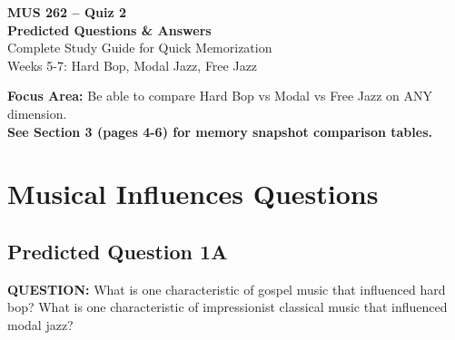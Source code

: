 \documentclass[11pt]{article}
\begin{document}
\begin{center}
{\Huge \textbf{MUS 262 – Quiz 2}}\\[5pt]
{\LARGE \textbf{Predicted Questions \& Answers}}\\[10pt]
{\Large Complete Study Guide for Quick Memorization}\\[5pt]
{\large Weeks 5-7: Hard Bop, Modal Jazz, Free Jazz}
\end{center}

\vspace{10pt}

\begin{tcolorbox}[colback=yellow!10!white, colframe=orange!75!black, title=\textbf{CRITICAL: ~30\% of Quiz 2 = THREE-WAY COMPARISONS}]
\textbf{Focus Area:} Be able to compare Hard Bop vs Modal vs Free Jazz on ANY dimension.\\
\textbf{See Section 3 (pages 4-6) for memory snapshot comparison tables.}
\end{tcolorbox}

\section{Musical Influences Questions}

\subsection*{Predicted Question 1A}

\begin{mdframed}[backgroundcolor=questioncolor!10, linewidth=2pt]
\textbf{\textcolor{questioncolor}{QUESTION:}} What is one characteristic of gospel music that influenced hard bop? What is one characteristic of impressionist classical music that influenced modal jazz?
\end{mdframed}
\end{document}
